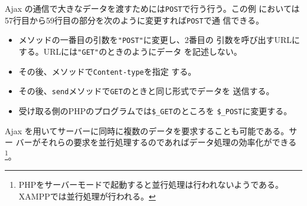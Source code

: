 Ajax の通信で大きなデータを渡すためには\texttt{POST}で行う行う。この例
においては57行目から59行目の部分を次のように変更すれば\texttt{POST}で通
信できる。
\begin{itemize}
 \item {}メソッドの一番目の引数を\Verb+"POST"+に変更し、2番目の
			 引数を呼び出すURLにする。URLには\Verb+"GET"+のときのようにデータ
			 を記述しない。
 \item その後、メソッドで\Verb+Content-type+を指定
			 する。
 \item その後、\Verb+send+メソッドで\Verb+GET+のときと同じ形式でデータを
			 送信する。
 \item 受け取る側のPHPのプログラムでは\Verb+$_GET+のところを
			 \Verb+$_POST+に変更する。
\end{itemize}
Ajax を用いてサーバーに同時に複数のデータを要求することも可能である。サー
バーがそれらの要求を並行処理するのであればデータ処理の効率化ができる
\footnote{PHPをサーバーモードで起動すると並行処理は行われないようである。
XAMPPでは並行処理が行われる。}。
